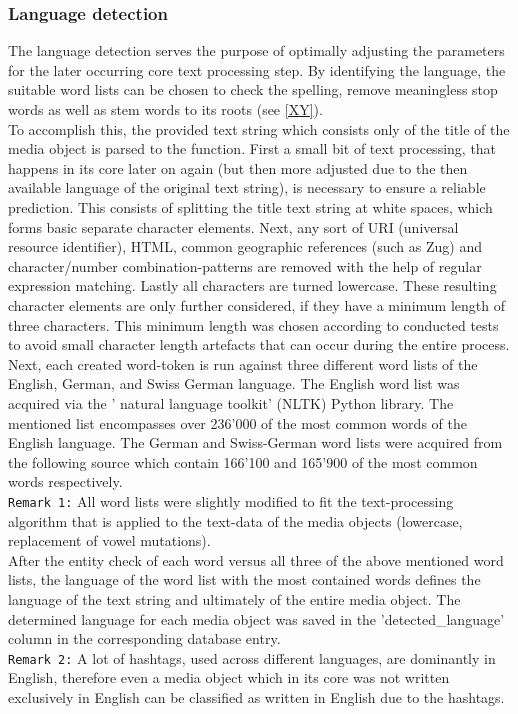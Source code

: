 \subsubsection{Language detection} \label{langauge_detection}
The language detection serves the purpose of optimally adjusting the parameters for the later occurring core text processing step. By identifying the language, the suitable word lists can be chosen to check the spelling, remove meaningless stop words as well as stem words to its roots (see \ref{XY}).\\
\newline
To accomplish this, the provided text string which consists only of the title of the media object is parsed to the function. First a small bit of text processing, that happens in its core later on again (but then more adjusted due to the then available language of the original text string), is necessary to ensure a reliable prediction. This consists of splitting the title text string at white spaces, which forms basic separate character elements. Next, any sort of URI (universal resource identifier), HTML, common geographic references (such as Zug) and character/number combination-patterns are removed with the help of regular expression matching. Lastly all characters are turned lowercase. These resulting character elements are only further considered, if they have a minimum length of three characters. This minimum length was chosen according to conducted tests to avoid small character length artefacts that can occur during the entire process.\\
Next, each created word-token is run against three different word lists of the English, German, and Swiss German language.
The English word list was acquired via the ' natural language toolkit' (NLTK) Python library. The mentioned list encompasses over 236'000 of the most common words of the English language.
The German and Swiss-German word lists were acquired from the following source \parencite{Geooffwicks} which contain 166'100 and 165'900  of the most common words respectively.\\
\newline
\texttt{Remark 1:} All word lists were slightly modified to fit the text-processing algorithm that is applied to the text-data of the media objects (lowercase, replacement of vowel mutations).\\
\newline
After the entity check of each word versus all three of the above mentioned word lists, the language of the word list with the most contained words defines the language of the text string and ultimately of the entire media object. The determined language for each media object was saved in the 'detected\_language' column in the corresponding database entry.\\
\newline
\texttt{Remark 2:} A lot of hashtags, used across different languages, are dominantly in English, therefore even a media object which in its core was not written exclusively in English can be classified as written in English due to the hashtags.

